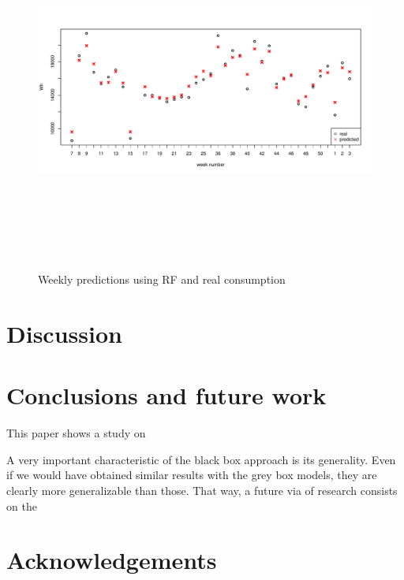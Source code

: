 \documentclass[3p,times,procedia]{elsarticle}
\begin{document}
\begin{figure}[h]%
\centering
\centerline{\includegraphics[width=12cm,height=12cm,keepaspectratio]{./pics/weekly_RF1.pdf}}
\caption{Weekly predictions using RF and real consumption}\vspace*{-6pt}
  \label{fig:weekly}
\end{figure}

\section{Discussion}




\section{Conclusions and future work}

This paper shows a study on

A very important characteristic of the black box approach is its generality. Even if we would have obtained similar results with the grey box models, they are clearly more generalizable than those. That way, a future via of research consists on the 

\section{Acknowledgements}




\end{document}
